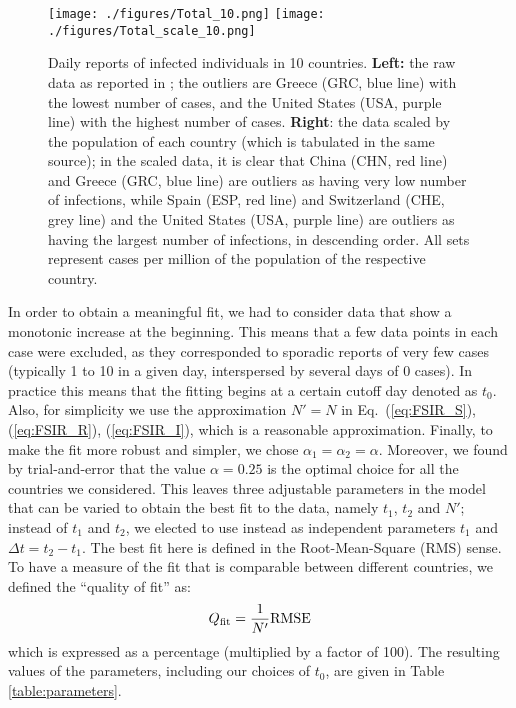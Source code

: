 \documentclass[aps,preprint]{revtex4}
\begin{document}
\begin{figure}[h]
\hspace{-0.04\textwidth}
\texttt{[image: ./figures/Total\_10.png]}
\hspace{-0.04\textwidth}
\texttt{[image: ./figures/Total\_scale\_10.png]}
\caption{
\small{
Daily reports of infected individuals in 10 countries. 
{\bf Left:} the raw data as reported in \cite{ECDC_source};
the outliers are Greece (GRC, blue line) with the lowest number of cases, 
and the United States (USA, purple line) with the highest number of cases. 
{\bf Right}: the data scaled by the population of each country
(which is tabulated in the same source);
in the scaled data, it is clear that China (CHN, red line) and Greece (GRC, blue line) 
are outliers as having very low number of infections, while Spain (ESP, red line) 
and Switzerland (CHE, grey line) and the United States (USA, purple line) 
are outliers as having the largest 
number of infections, in descending order.  
All sets represent cases per million of the population of the 
respective country. 
}
}
\label{fig:daily_10}
\end{figure}

In order to obtain a meaningful fit, we had to consider data that show a 
monotonic increase at the beginning.  This means that a few data points in 
each case were excluded, as they corresponded to sporadic reports 
of very few cases (typically 1 to 10 in a given day, interspersed by several days 
of 0 cases).  In practice this means that the fitting begins at a certain 
cutoff day denoted as $t_0$. 
Also, for simplicity we use the approximation $N' = N$ in 
Eq.~(\ref{eq:FSIR_S}), (\ref{eq:FSIR_R}), (\ref{eq:FSIR_I}), which 
is a reasonable approximation. Finally, to make the fit more robust 
and simpler, we chose $\alpha_1=\alpha_2=\alpha$. 
Moreover, we found by trial-and-error that the value $\alpha=0.25$ is 
the optimal choice for all the countries we considered.  
This  leaves three adjustable parameters in the model that 
can be varied to obtain the best fit to the data, namely $t_1$, $t_2$ and $N'$; 
instead of $t_1$ and $t_2$, we elected to use instead as independent 
parameters $t_1$ and $\Delta t = t_2-t_1$. 
The best fit here is defined in the Root-Mean-Square (RMS) sense. 
To have a measure of the fit that is comparable between different 
countries, we defined the ``quality of fit'' as:
\begin{equation}
Q_{\rm fit} = \frac{1}{N'} {\rm RMSE}
\label{eq:quality_fit}
\end{equation}
which is expressed as a percentage (multiplied by a factor of 100). 
The resulting values of the parameters, including our choices of $t_0$, 
are given in Table \ref{table:parameters}.
\end{document}
